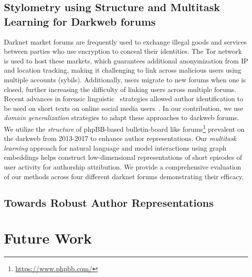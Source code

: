 \subsection{Stylometry using Structure and Multitask Learning for Darkweb forums}
Darknet market forums are frequently used to exchange illegal goods and services between parties who use encryption to conceal their identities.
The Tor network is used to host these markets, which guarantees additional anonymization from IP and location tracking, making it challenging to link across malicious users using multiple accounts (sybils).
Additionally, users migrate to new forums when one is closed, further increasing the difficulty of linking users across multiple forums. 
Recent advances in forensic linguistic~\citep{juola2008authorship} strategies allowed  author identification to be used on short texts on online social media users~\citep{shrestha2017convolutional,andrews2019learning}.
In our contribution, we use \textit{domain generalization} strategies to adapt these approaches to darkweb forums.
We utilize the \textit{structure} of phpBB-based bulletin-board like forums\footnote{\url{https://www.phpbb.com/}} prevalent on the darkweb from 2013-2017 to enhance author representations.
Our \textit{multitask learning} approach for natural language and model interactions using graph embeddings helps construct low-dimensional representations of short episodes of user activity for authorship attribution. 
We provide a comprehensive evaluation of our methods across four different darknet forums demonstrating their efficacy.

\subsection{Towards Robust Author Representations}


\section{Future Work}

